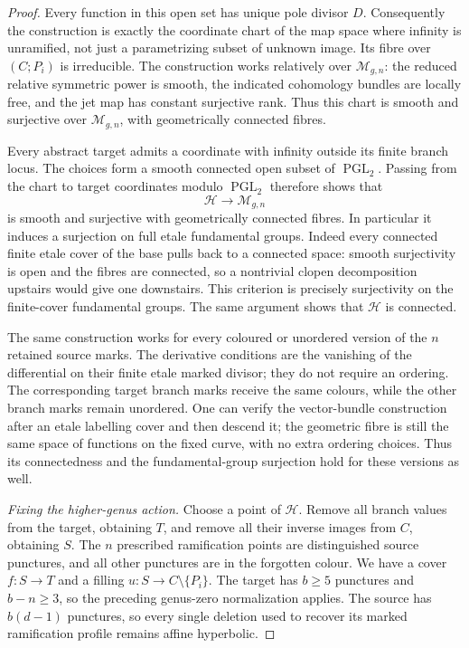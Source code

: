 \begin{proof}
Every function in this open set has unique pole divisor $D$.
Consequently the construction is exactly the coordinate chart of the
map space where infinity is unramified, not just a parametrizing
subset of unknown image. Its fibre over $(C;P_i)$ is irreducible.
The construction works relatively over $\mathcal M_{g,n}$:
the reduced relative symmetric power is smooth, the indicated
cohomology bundles are locally free, and the jet map has constant
surjective rank. Thus this chart is smooth and surjective over
$\mathcal M_{g,n}$, with geometrically connected fibres.

Every abstract target admits a coordinate with infinity outside its
finite branch locus. The choices form a smooth connected open subset
of $\operatorname{PGL}_2$. Passing from the chart to target coordinates
modulo $\operatorname{PGL}_2$ therefore shows that
\[
              \mathcal H\longrightarrow\mathcal M_{g,n}
                                                               \tag{E.13.7}
\]
is smooth and surjective with geometrically connected fibres. In
particular it induces a surjection on full etale fundamental groups.
Indeed every connected finite etale cover of the base pulls back to
a connected space: smooth surjectivity is open and the fibres are
connected, so a nontrivial clopen decomposition upstairs would give
one downstairs. This criterion is precisely surjectivity on the
finite-cover fundamental groups. The same argument shows that
$\mathcal H$ is connected.

The same construction works for every coloured or unordered version of
the $n$ retained source marks. The derivative conditions are the
vanishing of the differential on their finite etale marked divisor;
they do not require an ordering. The corresponding target branch marks
receive the same colours, while the other branch marks remain unordered.
One can verify the vector-bundle construction after an etale labelling
cover and then descend it; the geometric fibre is still the same space
of functions on the fixed curve, with no extra ordering choices.
Thus its connectedness and the fundamental-group surjection hold for
these versions as well.

\emph{Fixing the higher-genus action.}
Choose a point of $\mathcal H$. Remove all branch values from the
target, obtaining $T$, and remove all their inverse images from $C$,
obtaining $S$. The $n$ prescribed ramification points are distinguished
source punctures, and all other punctures are in the forgotten colour.
We have a cover $f:S\to T$ and a filling $u:S\to C\setminus\{P_i\}$.
The target has $b\ge5$ punctures and $b-n\ge3$, so the preceding
genus-zero normalization applies. The source has
$b(d-1)$ punctures, so every single deletion used to recover its
marked ramification profile remains affine hyperbolic.


\end{proof}
